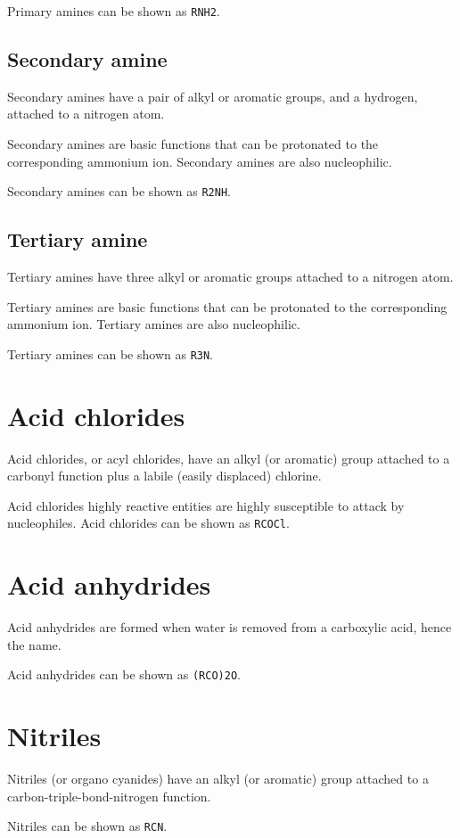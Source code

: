 \documentclass[12pt, oneside]{book}
\begin{document}
Primary amines can be shown as \texttt{RNH2}.

\subsection{Secondary amine}
Secondary amines have a pair of alkyl or aromatic groups, and a hydrogen,
attached to a nitrogen atom.

Secondary amines are basic functions that can be protonated to the corresponding
ammonium ion.
Secondary amines are also nucleophilic.

Secondary amines can be shown as \texttt{R2NH}.

\subsection{Tertiary amine}
Tertiary amines have three alkyl or aromatic groups attached to a nitrogen atom.

Tertiary amines are basic functions that can be protonated to the corresponding
ammonium ion.
Tertiary amines are also nucleophilic.

Tertiary amines can be shown as \texttt{R3N}.

\section{Acid chlorides}
Acid chlorides, or acyl chlorides, have an alkyl (or aromatic) group attached to
a carbonyl function plus a labile (easily displaced) chlorine.

Acid chlorides highly reactive entities are highly susceptible to attack by
nucleophiles.
Acid chlorides can be shown as \texttt{RCOCl}.

\section{Acid anhydrides}
Acid anhydrides are formed when water is removed from a carboxylic acid, hence
the name.

Acid anhydrides can be shown as \texttt{(RCO)2O}.

\section{Nitriles}
Nitriles (or organo cyanides) have an alkyl (or aromatic) group attached to a
carbon-triple-bond-nitrogen function.

Nitriles can be shown as \texttt{RCN}.
\end{document}
